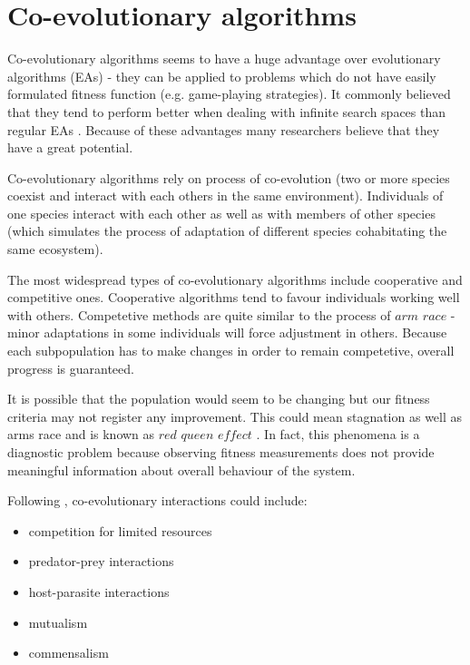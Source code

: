 \section{Co-evolutionary algorithms}
\label{sec:co-evol}

Co-evolutionary algorithms seems to have a huge advantage over evolutionary algorithms (EAs) - they can be applied to problems which do not have easily formulated 
fitness function (e.g. game-playing strategies).
It commonly believed that they tend to perform better when dealing with infinite search spaces than regular EAs \cite{co-evol}.
Because of these advantages many researchers believe that they have a great potential.

Co-evolutionary algorithms rely on process of co-evolution (two or more species coexist and interact with each others in the same environment).
Individuals of one species interact with each other as well as with members of other species (which simulates the process of adaptation of different species cohabitating the same 
ecosystem).

The most widespread types of co-evolutionary algorithms include cooperative and competitive ones.
Cooperative algorithms tend to favour individuals working well with others.
Competetive methods are quite similar to the process of $arm$ $race$ - minor adaptations in some individuals will force adjustment in others.
Because each subpopulation has to make changes in order to remain competetive, overall progress is guaranteed. 
  
It is possible that the population would seem to be changing but our fitness criteria may not register any improvement.
This could mean stagnation as well as arms race and is known as $red$ $queen$ $effect$ \cite{co-evol}.
In fact, this phenomena is a diagnostic problem because observing fitness measurements does not provide meaningful information about overall behaviour of the system.
 


Following \cite{Dre}, co-evolutionary interactions could include:

\begin{itemize}
  \item competition for limited resources
  \item predator-prey interactions
  \item host-parasite interactions
  \item mutualism
  \item commensalism
\end{itemize}

